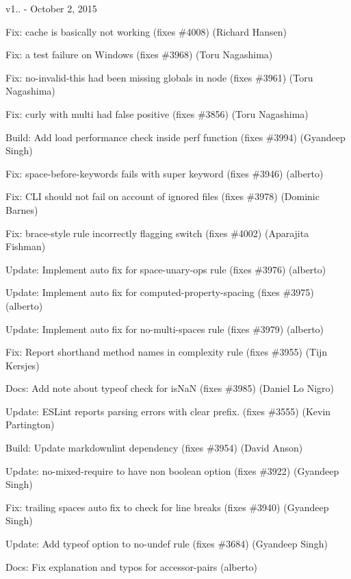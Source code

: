 v1.. -\/ October 2, 2015


\begin{DoxyItemize}
\item Fix\+: cache is basically not working (fixes \#4008) (Richard Hansen)
\item Fix\+: a test failure on Windows (fixes \#3968) (Toru Nagashima)
\item Fix\+: {\ttfamily no-\/invalid-\/this} had been missing globals in node (fixes \#3961) (Toru Nagashima)
\item Fix\+: {\ttfamily curly} with {\ttfamily multi} had false positive (fixes \#3856) (Toru Nagashima)
\item Build\+: Add load performance check inside perf function (fixes \#3994) (Gyandeep Singh)
\item Fix\+: space-\/before-\/keywords fails with super keyword (fixes \#3946) (alberto)
\item Fix\+: C\+LI should not fail on account of ignored files (fixes \#3978) (Dominic Barnes)
\item Fix\+: brace-\/style rule incorrectly flagging switch (fixes \#4002) (Aparajita Fishman)
\item Update\+: Implement auto fix for space-\/unary-\/ops rule (fixes \#3976) (alberto)
\item Update\+: Implement auto fix for computed-\/property-\/spacing (fixes \#3975) (alberto)
\item Update\+: Implement auto fix for no-\/multi-\/spaces rule (fixes \#3979) (alberto)
\item Fix\+: Report shorthand method names in complexity rule (fixes \#3955) (Tijn Kersjes)
\item Docs\+: Add note about typeof check for is\+NaN (fixes \#3985) (Daniel Lo Nigro)
\item Update\+: E\+S\+Lint reports parsing errors with clear prefix. (fixes \#3555) (Kevin Partington)
\item Build\+: Update markdownlint dependency (fixes \#3954) (David Anson)
\item Update\+: {\ttfamily no-\/mixed-\/require} to have non boolean option (fixes \#3922) (Gyandeep Singh)
\item Fix\+: trailing spaces auto fix to check for line breaks (fixes \#3940) (Gyandeep Singh)
\item Update\+: Add {\ttfamily typeof} option to {\ttfamily no-\/undef} rule (fixes \#3684) (Gyandeep Singh)
\item Docs\+: Fix explanation and typos for accessor-\/pairs (alberto)

\end{DoxyItemize}
